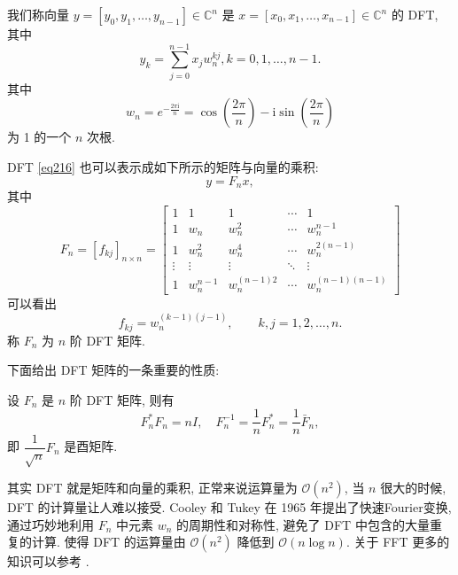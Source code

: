 \documentclass{ecnumaster}
\renewcommand{\O}{\mathcal{O}}
\begin{document}
\begin{definition}
  我们称向量 $y = [y_0, y_1, \dots, y_{n-1}] \in \mathbb{C}^n$ 是 $x = [x_0, x_1, \dots, x_{n-1}] \in \mathbb{C}^n$ 的 DFT, 其中
  \begin{equation}\label{eq216}
    y_k = \sum _{j=0}^{n-1}x_jw_n^{kj}, k=0,1,\dots,n-1.
  \end{equation}
  其中
  \begin{equation}\nonumber
    w_n = e^{-\frac{2\pi \mathrm{i}}{n}} = \cos{\left(\frac{2\pi}{n}\right)} - \mathrm{i}\sin{\left(\frac{2\pi}{n}\right)}
  \end{equation}
  为 1 的一个 $n$ 次根.
\end{definition}
DFT \eqref{eq216} 也可以表示成如下所示的矩阵与向量的乘积:
\begin{equation}\nonumber
  y = F_nx,
\end{equation}
其中
\begin{equation}\label{eqdft}
  F_n = [f_{kj}]_{n\times n} = \left[
  \begin{matrix}
    1 &1 &1 &\cdots &1\\
    1 &w_n &w_n^2 &\cdots &w_n^{n-1}\\
    1 &w_n^2 &w_n^4 &\cdots &w_n^{2(n-1)}\\
    \vdots &\vdots &\vdots &\ddots &\vdots\\
    1 &w_n^{n-1} &w_n^{(n-1)2} &\cdots &w_n^{(n-1)(n-1)}
  \end{matrix}
  \right]
\end{equation}
可以看出
\begin{equation}\nonumber
  f_{kj} = w_n^{(k-1)(j-1)}, \qquad k,j = 1,2,\dots,n.
\end{equation}
称 $F_n$ 为 $n$ 阶 DFT 矩阵\cite{GL13}.

下面给出 DFT 矩阵的一条重要的性质:
\begin{lemma}
  设 $F_n$ 是 $n$ 阶 DFT 矩阵, 则有
  \begin{equation}\nonumber
    F_n^*F_n = nI, \quad F_n^{-1} = \frac{1}{n}F_n^* = \frac{1}{n}\bar{F}_n,
  \end{equation}
  即 $\dfrac{1}{\sqrt{n}}F_n$ 是酉矩阵.
\end{lemma}

其实 DFT 就是矩阵和向量的乘积,
正常来说运算量为 $\mathcal{O}(n^2)$, 当 $n$ 很大的时候,
DFT 的计算量让人难以接受.
Cooley 和 Tukey\cite{CT65} 在 1965 年提出了快速Fourier变换,
通过巧妙地利用 $F_n$ 中元素 $w_n$ 的周期性和对称性,
避免了 DFT 中包含的大量重复的计算.
使得 DFT 的运算量由 $\O(n^2)$ 降低到 $\O(n\log n)$.
关于 FFT 更多的知识可以参考 \cite{DV90, L92}.
\end{document}
